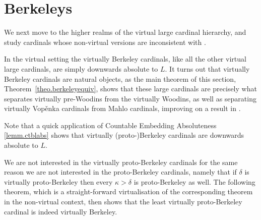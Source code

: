 \documentclass[../../main]{subfiles}
\begin{document}
\section{Berkeleys}

We next move to the higher realms of the virtual large cardinal hierarchy, and study cardinals whose non-virtual versions are inconsistent with \zfc.

\qquad In the virtual setting the virtually Berkeley cardinals, like all the other virtual large cardinals, are simply downwards absolute to $L$. It turns out that virtually Berkeley cardinals are natural objects, as the main theorem of this section, Theorem~\ref{theo.berkeleyequiv}, shows that these large cardinals are precisely what separates virtually pre-Woodins from the virtually Woodins, as well as separating virtually Vop\v enka cardinals from Mahlo cardinals, improving on a result in \cite{GitmanHamkins}.


Note that a quick application of Countable Embedding Absoluteness \ref{lemm.ctblabs} shows that virtually (proto-)Berkeley cardinals are downwards absolute to $L$.

\qquad We are not interested in the virtually proto-Berkeley cardinals for the same reason we are not interested in the proto-Berkeley cardinals, namely that if $\delta$ is virtually proto-Berkeley then every $\kappa>\delta$ is proto-Berkeley as well. The following theorem, which is a straight-forward virtualisation of the corresponding theorem in the non-virtual context, then shows that the least virtually proto-Berkeley cardinal is indeed virtually Berkeley.
\end{document}
